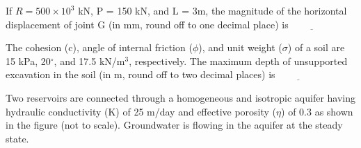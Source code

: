 If $R = 500\times 10^3$ kN, P = 150 kN, and L = 3m, the magnitude of the horizontal displacement of joint G (in mm, round off to one decimal place) is$\underline{\hspace{2cm}}$
\bigskip
\item The cohesion (c), angle of internal friction ($\phi$), and unit weight ($\sigma$) of a soil are 15 kPa, 20$^\circ$, and 17.5 kN/m$^3$, respectively. The maximum depth of unsupported excavation in the soil (in m, round off to two decimal places) is$\underline{\hspace{2cm}}$

\bigskip
\item Two reservoirs are connected through a homogeneous and isotropic aquifer having hydraulic conductivity (K) of 25 m/day and effective porosity ($\eta$) of 0.3 as shown in the figure (not to scale). Groundwater is flowing in the aquifer at the steady state. \\
